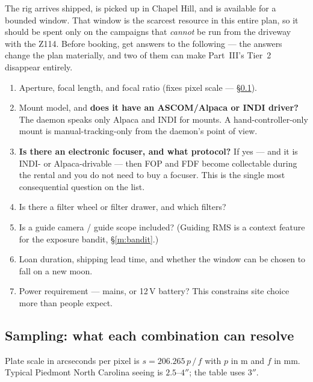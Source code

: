 \documentclass[11pt]{article}
\begin{document}
The rig arrives shipped, is picked up in Chapel Hill, and is available for a
bounded window. That window is the scarcest resource in this entire plan, so it
should be spent only on the campaigns that \emph{cannot} be run from the
driveway with the Z114. Before booking, get answers to the following --- the
answers change the plan materially, and two of them can make Part~III's Tier~2
disappear entirely.

\begin{enumerate}
\item Aperture, focal length, and focal ratio (fixes pixel scale --- \S\ref{sec:sampling}).
\item Mount model, and \textbf{does it have an ASCOM/Alpaca or INDI driver?}
      The daemon speaks only Alpaca and INDI for mounts. A hand-controller-only
      mount is manual-tracking-only from the daemon's point of view.
\item \textbf{Is there an electronic focuser, and what protocol?} If yes ---
      and it is INDI- or Alpaca-drivable --- then FOP and FDF become
      collectable during the rental and you do not need to buy a focuser. This
      is the single most consequential question on the list.
\item Is there a filter wheel or filter drawer, and which filters?
\item Is a guide camera / guide scope included? (Guiding RMS is a context
      feature for the exposure bandit, \S\ref{m:bandit}.)
\item Loan duration, shipping lead time, and whether the window can be chosen
      to fall on a new moon.
\item Power requirement --- mains, or 12\,V battery? This constrains site
      choice more than people expect.
\end{enumerate}

\subsection{Sampling: what each combination can resolve}\label{sec:sampling}

Plate scale in arcseconds per pixel is $s = 206.265\,p\,/\,f$ with $p$ in
\textmu m and $f$ in mm. Typical Piedmont North Carolina seeing is
$2.5$--$4''$; the table uses $3''$.
\end{document}
